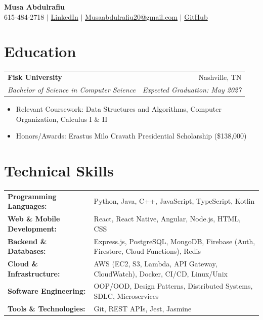 \documentclass[10pt,letterpaper]{article}
\newcommand{\resumeItemListStart}{\begin{itemize}}
\newcommand{\resumeItemListEnd}{\end{itemize}}
\newcommand{\resumeSubheading}[4]{
  \vspace{1pt}
  \begin{tabularx}{\textwidth}{Xr}
    \textbf{#1} & #2 \\
    \textit{#3} & \textit{#4} \\
  \end{tabularx}\vspace{-3pt}
}
\begin{document}
\begin{center}
    {\LARGE \textbf{Musa Abdulrafiu}}\\
    615-484-2718 $|$ \href{https://www.linkedin.com/in/musa-abdulrafiu}{LinkedIn} $|$ \href{mailto:Musaabdulrafiu20@gmail.com}{Musaabdulrafiu20@gmail.com} $|$ \href{https://github.com/MMAbdul153}{GitHub}
\end{center}

\section*{Education}
\resumeSubheading
{Fisk University} {Nashville, TN}
{Bachelor of Science in Computer Science} {Expected Graduation: May 2027}
\resumeItemListStart
    \item Relevant Coursework: Data Structures and Algorithms, Computer Organization, Calculus I \& II
    \item Honors/Awards: Erastus Milo Cravath Presidential Scholarship (\$138,000)
\resumeItemListEnd

\section*{Technical Skills}
\begin{tabularx}{\textwidth}{@{}lX@{}}
\textbf{Programming Languages:} & Python, Java, C++, JavaScript, TypeScript, Kotlin \\
\textbf{Web \& Mobile Development:} & React, React Native, Angular, Node.js, HTML, CSS \\
\textbf{Backend \& Databases:} & Express.js, PostgreSQL, MongoDB, Firebase (Auth, Firestore, Cloud Functions), Redis \\
\textbf{Cloud \& Infrastructure:} & AWS (EC2, S3, Lambda, API Gateway, CloudWatch), Docker, CI/CD, Linux/Unix \\
\textbf{Software Engineering:} & OOP/OOD, Design Patterns, Distributed Systems, SDLC, Microservices \\
\textbf{Tools \& Technologies:} & Git, REST APIs, Jest, Jasmine \\
\end{tabularx}
\end{document}
